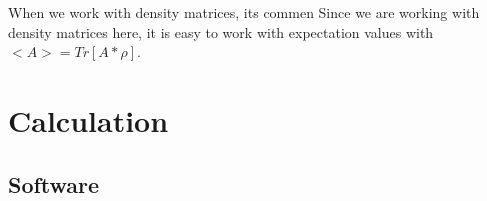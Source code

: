 \documentclass[12pt,a4paper]{article}
\begin{document}
 When we work with density matrices, its commen Since we are working with density matrices here, it is easy to work with expectation values with $<A>=Tr[A*\rho]$.


\section{Calculation}

\subsection{Software}
\end{document}
